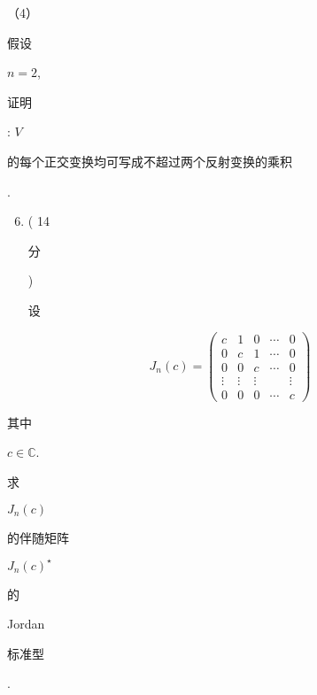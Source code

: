 \documentclass[10pt]{article}
\begin{document}
（4）\begin{CJK}{UTF8}{mj}假设\end{CJK} $n=2$, \begin{CJK}{UTF8}{mj}证明\end{CJK}: $V$ \begin{CJK}{UTF8}{mj}的每个正交变换均可写成不超过两个反射变换的乘积\end{CJK}.

\begin{enumerate}
  \setcounter{enumi}{5}
  \item ( 14 \begin{CJK}{UTF8}{mj}分\end{CJK}) \begin{CJK}{UTF8}{mj}设\end{CJK}
\end{enumerate}
$$
J_{n}(c)=\left(\begin{array}{ccccc}
c & 1 & 0 & \cdots & 0 \\
0 & c & 1 & \cdots & 0 \\
0 & 0 & c & \cdots & 0 \\
\vdots & \vdots & \vdots & & \vdots \\
0 & 0 & 0 & \cdots & c
\end{array}\right)
$$
\begin{CJK}{UTF8}{mj}其中\end{CJK} $c \in \mathbb{C}$. \begin{CJK}{UTF8}{mj}求\end{CJK} $J_{n}(c)$ \begin{CJK}{UTF8}{mj}的伴随矩阵\end{CJK} $J_{n}(c)^{\star}$ \begin{CJK}{UTF8}{mj}的\end{CJK} Jordan \begin{CJK}{UTF8}{mj}标准型\end{CJK}.
\end{document}
